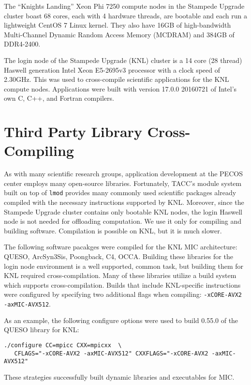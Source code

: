 The ``Knights Landing'' Xeon Phi 7250 compute nodes in the Stampede Upgrade
cluster boast 68 cores, each with 4 hardware threads, are bootable and each run
a lightweight CentOS 7 Linux kernel.  They also have 16GB of high-bandwidth
Multi-Channel Dynamic Random Access Memory (MCDRAM) and 384GB of DDR4-2400.

The login node of the Stampede Upgrade (KNL) cluster is a 14 core (28 thread)
Haswell generation Intel Xeon E5-2695v3 processor with a clock speed of
2.30GHz.  This was used to cross-compile scientific applications for the KNL
compute nodes.  Applications were built with version 17.0.0 20160721 of Intel's
own C, C++, and Fortran compilers.

\section{Third Party Library Cross-Compiling}
\label{sec:cross_compile}

As with many scientific research groups, application development at the PECOS
center employs many open-source libraries.  Fortunately, TACC's module system
built on top of \texttt{lmod} provides many commonly used scientific packages
already compiled with the necessary instructions supported by KNL.  Moreover,
since the Stampede Upgrade cluster contains only bootable KNL nodes, the login
Haswell node is not needed for offloading computation.  We use it only for
compiling and building software.  Compilation is possible on KNL, but it is
much slower.

The following software pacakges were compiled for the KNL MIC architecture:
QUESO, ArcSyn3Sis, Poongback, C4, OCCA.  Building these libraries for the login
node environment is a well supported, common task, but building them for KNL
required cross-compilation.  Many of these libraries utilize a build system
which supports cross-compilation.  Builds that include KNL-specific
instructions were configured by specifying two additional flags when compiling:
\texttt{-xCORE-AVX2 -axMIC-AVX512}.

As an example, the following configure options were used to build 0.55.0 of the
QUESO library for KNL:

\vspace*{-6pt}
{\small
\begin{verbatim}
./configure CC=mpicc CXX=mpicxx  \
   CFLAGS="-xCORE-AVX2 -axMIC-AVX512" CXXFLAGS="-xCORE-AVX2 -axMIC-AVX512"
\end{verbatim}
}

These strategies successfully built dynamic libraries and executables for
MIC.

